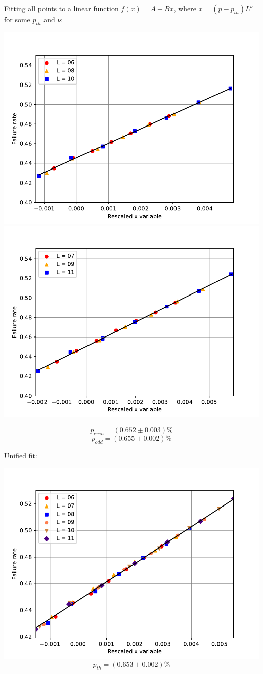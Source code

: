 \documentclass[pra]{revtex4-1}
\begin{document}
\noindent Fitting all points to a linear function $f(x) = A + Bx$, where $x=(p-p_{th})L^{\nu}$ for some $p_{th}$ and $\nu$: 
  
\includegraphics[width=.49\textwidth]{../graphs-paper2/swl-dephasing-even-rescaled.pdf}
\includegraphics[width=.49\textwidth]{../graphs-paper2/swl-dephasing-odd-rescaled.pdf}

\[  p_{even} = (0.652 \pm 0.003)\% \]
\[  p_{odd} = (0.655 \pm 0.002)\% \]
\clearpage 

Unified fit: \begin{center} 

\includegraphics[width=.9\textwidth]{../graphs-paper2/swl-dephasing-rescaled.pdf}
\[  p_{th} = (0.653 \pm 0.002)\% \] \end{center}
\clearpage 
\end{document}
